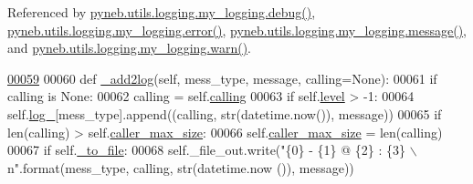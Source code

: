 Referenced by \hyperlink{logging_8py_source_l00069}{pyneb.\-utils.\-logging.\-my\-\_\-logging.\-debug()}, \hyperlink{logging_8py_source_l00099}{pyneb.\-utils.\-logging.\-my\-\_\-logging.\-error()}, \hyperlink{logging_8py_source_l00079}{pyneb.\-utils.\-logging.\-my\-\_\-logging.\-message()}, and \hyperlink{logging_8py_source_l00089}{pyneb.\-utils.\-logging.\-my\-\_\-logging.\-warn()}.


\begin{DoxyCode}
\hypertarget{classpyneb_1_1utils_1_1logging_1_1my__logging_l00059}{}\hyperlink{classpyneb_1_1utils_1_1logging_1_1my__logging_a8de4d2383bfa53411876a066e1bf72de}{00059} 
00060     \textcolor{keyword}{def }\hyperlink{classpyneb_1_1utils_1_1logging_1_1my__logging_a8de4d2383bfa53411876a066e1bf72de}{\_add2log}(self, mess\_type, message, calling=None):
00061         \textcolor{keywordflow}{if} calling \textcolor{keywordflow}{is} \textcolor{keywordtype}{None}:
00062             calling = self.\hyperlink{classpyneb_1_1utils_1_1logging_1_1my__logging_a38735db2b351731f0fb79d4a0eb231ab}{calling}
00063         \textcolor{keywordflow}{if} self.\hyperlink{classpyneb_1_1utils_1_1logging_1_1my__logging_aa70215328c3f7a97a607c584026e144a}{level} > -1:
00064             self.\hyperlink{classpyneb_1_1utils_1_1logging_1_1my__logging_a4bda17b594629b5490207080dbcb3bbd}{log\_}[mess\_type].append((calling, str(datetime.now()), message))
00065             \textcolor{keywordflow}{if} len(calling) > self.\hyperlink{classpyneb_1_1utils_1_1logging_1_1my__logging_a0449825f771bc794da88ba49666726d5}{caller\_max\_size}:
00066                 self.\hyperlink{classpyneb_1_1utils_1_1logging_1_1my__logging_a0449825f771bc794da88ba49666726d5}{caller\_max\_size} = len(calling)
00067             \textcolor{keywordflow}{if} self.\hyperlink{classpyneb_1_1utils_1_1logging_1_1my__logging_a6fd66745606a3cc0477edafcfdd24fe2}{\_to\_file}:
00068                 self.\_file\_out.write(\textcolor{stringliteral}{"\{0\} - \{1\} @ \{2\} : \{3\} \(\backslash\)n"}.format(mess\_type, calling, str(datetime.now
      ()), message))

\end{DoxyCode}
